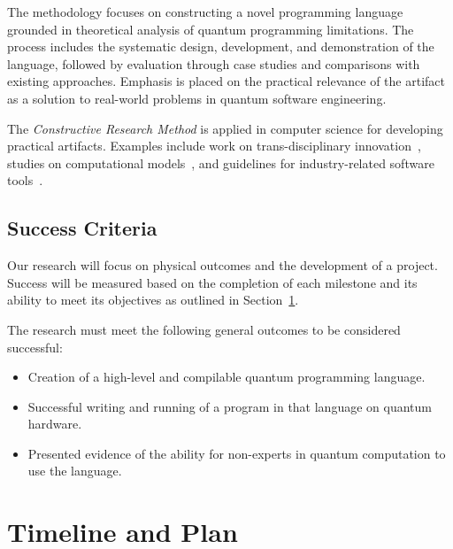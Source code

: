 \documentclass[journal,onecolumn, compsoc]{IEEEtran}
\begin{document}
The methodology focuses on constructing a novel programming language grounded in theoretical analysis of quantum programming limitations. 
The process includes the systematic design, development, and demonstration of the language, followed by evaluation through case studies and comparisons with existing approaches. 
Emphasis is placed on the practical relevance of the artifact as a solution to real-world problems in quantum software engineering.

The \textit{Constructive Research Method} is applied in computer science for developing practical artifacts. Examples include work on trans-disciplinary innovation~\cite{mcgregor2018}, studies on computational models~\cite{dodig2010}, and guidelines for industry-related software tools~\cite{lassenius2001}.

\subsection{Success Criteria}
Our research will focus on physical outcomes and the development of a project.
Success will be measured based on the completion of each milestone and its ability to meet its objectives as outlined in Section~\ref{sec:timeline-plan}.

The research must meet the following general outcomes to be considered successful:
\begin{itemize}
    \item Creation of a high-level and compilable quantum programming language.
    \item Successful writing and running of a program in that language on quantum hardware.
    \item Presented evidence of the ability for non-experts in quantum computation to use the language.
\end{itemize}

\section{Timeline and Plan}\label{sec:timeline-plan}
\end{document}
